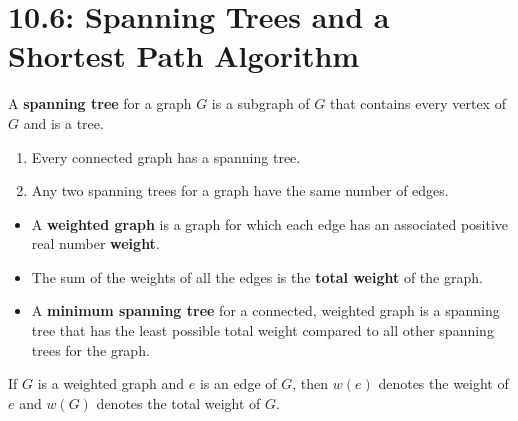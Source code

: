 \documentclass[../mathNotesPreamble]{subfiles}
\providecommand{\relscalefact}{1.4}
\begin{document}
\relscale{\relscalefact}
  \section{10.6: Spanning Trees and a Shortest Path Algorithm}
  \begin{defn*}
    A \textbf{spanning tree} for a graph $G$ is a subgraph of $G$ that contains every vertex of $G$ and is a tree.
  \end{defn*}
  \begin{thmBox*}[Proposition 10.6.1]
    \begin{enumerate}
      \item Every connected graph has a spanning tree.
      \item Any two spanning trees for a graph have the same number of edges.
    \end{enumerate}
  \end{thmBox*}
  \begin{defn*}
    \begin{itemize}
      \item A \textbf{weighted graph} is a graph for which each edge has an associated positive real number \textbf{weight}.
      \item The sum of the weights of all the edges is the \textbf{total weight} of the graph.
      \item A \textbf{minimum spanning tree} for a connected, weighted graph is a spanning tree that has the least possible total weight compared to all other spanning trees for the graph.
    \end{itemize}
    If $G$ is a weighted graph and $e$ is an edge of $G$, then $w(e)$ denotes the weight of $e$ and $w(G)$ denotes the total weight of $G$.
  \end{defn*}
  \pagebreak
\end{document}
